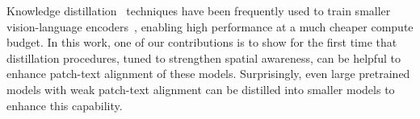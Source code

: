 Knowledge distillation~\cite{hinton2015distilling} techniques have been frequently used to train smaller vision-language encoders~\cite{tips_paper,tschannen2025siglip2multilingualvisionlanguage,bolya2025perceptionencoderbestvisual}, enabling high performance at a much cheaper compute budget.
In this work, one of our contributions is to show for the first time that distillation procedures, tuned to strengthen spatial awareness, can be helpful to enhance patch-text alignment of these models.
Surprisingly, even large pretrained models with weak patch-text alignment can be distilled into smaller models to enhance this capability.

















